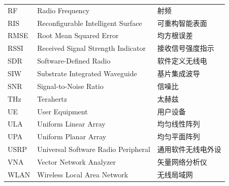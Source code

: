 \begin{longtable}{p{2.3cm}p{7cm}p{4cm}}
	RF     & Radio Frequency                                  & 射频         \\
	RIS    & Reconfigurable Intelligent Surface               & 可重构智能表面    \\
	RMSE   & Root Mean Squared Error                          & 均方根误差   \\
	RSSI   & Received Signal Strength Indicator               & 接收信号强度指示 \\
	SDR    & Software-Defined Radio                           & 软件定义无线电    \\
	SIW    & Substrate Integrated Waveguide                   & 基片集成波导     \\
	SNR    & Signal-to-Noise Ratio                            & 信噪比        \\
	THz    & Terahertz                                        & 太赫兹        \\
	UE     & User Equipment                                   & 用户设备         \\
	ULA    & Uniform Linear Array                             & 均匀线性阵列     \\
	UPA    & Uniform Planar Array                             & 均匀平面阵列     \\
	USRP   & Universal Software Radio Peripheral              & 通用软件无线电外设  \\
	VNA    & Vector Network Analyzer                          & 矢量网络分析仪    \\
	WLAN   & Wireless Local Area Network                      & 无线局域网      \\
\end{longtable}
